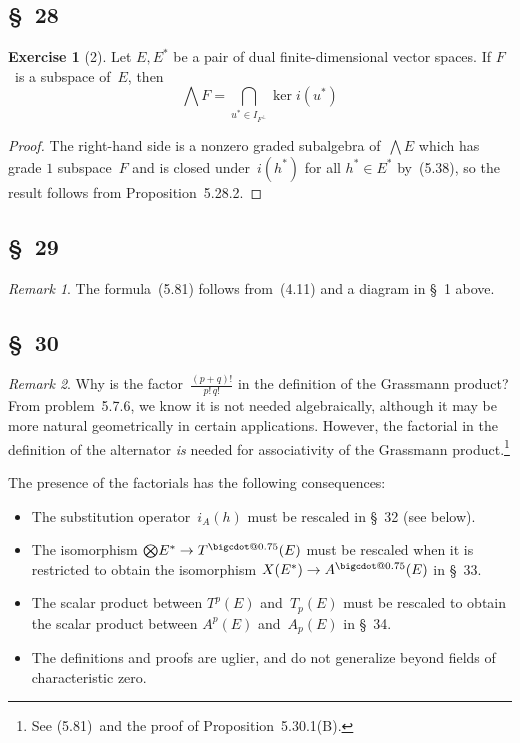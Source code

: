 \documentclass[letterpaper,12pt]{article}
\makeatletter
\newcommand{\bigcdot}[1]{\mathbin{\mathpalette\bigcdot@{#1}}}
\newcommand{\bigcdot@}[2]{%
  \sbox0{$#1\vcenter{}$}%
  \sbox2{$#1\cdot\m@th$}%
  \hbox{%
    \hfil
    \raise\ht0\hbox{%
      \scalebox{#2}{%
        \lower\ht0\hbox{$#1\bullet\m@th$}%
      }%
    }%
    \hfil
  }%
}
\newcommand{\bigsect}{\bigcap}
\newcommand{\bigtprod}{\bigotimes}
\newcommand{\medtprod}{{\textstyle\bigtprod}}
\newcommand{\bigeprod}{\bigwedge}
\newcommand{\medeprod}{{\textstyle\bigeprod}}
\newcommand{\tdot}{\bigcdot{0.75}}
\newcommand{\oc}[1]{#1^{\perp}}
\theoremstyle{definition}
\newtheorem*{exer}{Exercise}
\theoremstyle{remark}
\newtheorem*{rmk}{Remark}
\makeatother
\begin{document}
\subsection*{\S~28}
\begin{exer}[2]
Let \(E,E^*\) be a pair of dual finite-dimensional vector spaces. If \(F\)~is a subspace of~\(E\), then
\[\medeprod F=\bigsect_{u^*\in I_{\oc{F}}}\ker i(u^*)\]
\end{exer}
\begin{proof}
The right-hand side is a nonzero graded subalgebra of~\(\medeprod E\) which has grade \(1\) subspace~\(F\) and is closed under~\(i(h^*)\) for all \(h^*\in E^*\) by~(5.38), so the result follows from Proposition~5.28.2.
\end{proof}

\subsection*{\S~29}
\begin{rmk} The formula~(5.81) follows from~(4.11) and a diagram in \S~1 above.
\end{rmk}

\subsection*{\S~30}
\begin{rmk}
Why is the factor~\(\frac{(p+q)!}{p!\,q!}\) in the definition of the Grassmann product? From problem~5.7.6, we know it is not needed algebraically, although it may be more natural geometrically in certain applications. However, the factorial in the definition of the alternator \emph{is} needed for associativity of the Grassmann product.\footnote{See (5.81)~and the proof of Proposition~5.30.1(B).}

The presence of the factorials has the following consequences:
\begin{itemize}
\item The substitution operator~\(i_A(h)\) must be rescaled in \S~32 (see below).
\item The isomorphism \(\medtprod E^*\to T^{\tdot}(E)\) must be rescaled when it is restricted to obtain the isomorphism \(X(E^*)\to A^{\tdot}(E)\) in \S~33.
\item The scalar product between \(T^p(E)\) and~\(T_p(E)\) must be rescaled to obtain the scalar product between \(A^p(E)\) and~\(A_p(E)\) in \S~34.
\item The definitions and proofs are uglier, and do not generalize beyond fields of characteristic zero.
\end{itemize}
\end{rmk}
\end{document}
